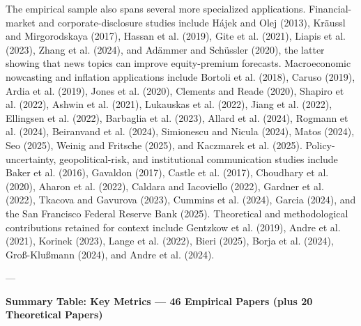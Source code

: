 \documentclass[11pt,twocolumn]{article}
\begin{document}
The empirical sample also spans several more specialized applications. Financial-market and corporate-disclosure studies include Hájek and Olej (2013), Kräussl and Mirgorodskaya (2017), Hassan et al. (2019), Gite et al. (2021), Liapis et al. (2023), Zhang et al. (2024), and Adämmer and Schüssler (2020), the latter showing that news topics can improve equity-premium forecasts. Macroeconomic nowcasting and inflation applications include Bortoli et al. (2018), Caruso (2019), Ardia et al. (2019), Jones et al. (2020), Clements and Reade (2020), Shapiro et al. (2022), Ashwin et al. (2021), Lukauskas et al. (2022), Jiang et al. (2022), Ellingsen et al. (2022), Barbaglia et al. (2023), Allard et al. (2024), Rogmann et al. (2024), Beiranvand et al. (2024), Simionescu and Nicula (2024), Matos (2024), Seo (2025), Weinig and Fritsche (2025), and Kaczmarek et al. (2025). Policy-uncertainty, geopolitical-risk, and institutional communication studies include Baker et al. (2016), Gavaldon (2017), Castle et al. (2017), Choudhary et al. (2020), Aharon et al. (2022), Caldara and Iacoviello (2022), Gardner et al. (2022), Tkacova and Gavurova (2023), Cummins et al. (2024), Garcia (2024), and the San Francisco Federal Reserve Bank (2025). Theoretical and methodological contributions retained for context include Gentzkow et al. (2019), Andre et al. (2021), Korinek (2023), Lange et al. (2022), Bieri (2025), Borja et al. (2024), Groß-Klußmann (2024), and Andre et al. (2024).

---

\noindent\textbf{Summary Table: Key Metrics — 46 Empirical Papers (plus 20 Theoretical Papers)}
\end{document}
